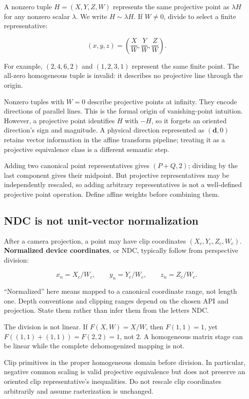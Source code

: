 A nonzero tuple \(H=(X,Y,Z,W)\) represents the same projective point as \(\lambda H\) for any nonzero scalar \(\lambda\). We write \(H\sim\lambda H\). If \(W\ne0\), divide to select a finite representative:

\[
(x,y,z)=\left(\frac XW,\frac YW,\frac ZW\right).
\]

For example, \((2,4,6,2)\) and \((1,2,3,1)\) represent the same finite point. The all-zero homogeneous tuple is invalid: it describes no projective line through the origin.

Nonzero tuples with \(W=0\) describe projective points at infinity. They encode directions of parallel lines. This is the formal origin of vanishing-point intuition. However, a projective point identifies \(H\) with \(-H\), so it forgets an oriented direction's sign and magnitude. A physical direction represented as \((\mathbf d,0)\) retains vector information in the affine transform pipeline; treating it as a projective equivalence class is a different semantic step.

Adding two canonical point representatives gives \((P+Q,2)\); dividing by the last component gives their midpoint. But projective representatives may be independently rescaled, so adding arbitrary representatives is not a well-defined projective point operation. Define affine weights before combining them.

\subsection{NDC is not unit-vector normalization}\label{01-foundations-i-ch018-ndc-is-not-unit-vector-normalization}

After a camera projection, a point may have clip coordinates \((X_c,Y_c,Z_c,W_c)\). \textbf{Normalized device coordinates}, or NDC, typically follow from perspective division:

\[
x_n=X_c/W_c,\qquad y_n=Y_c/W_c,\qquad z_n=Z_c/W_c.
\]

``Normalized'' here means mapped to a canonical coordinate range, not length one. Depth conventions and clipping ranges depend on the chosen API and projection. State them rather than infer them from the letters NDC.

The division is not linear. If \(F(X,W)=X/W\), then \(F(1,1)=1\), yet \(F((1,1)+(1,1))=F(2,2)=1\), not \(2\). A homogeneous matrix stage can be linear while the complete dehomogenized mapping is not.

Clip primitives in the proper homogeneous domain before division. In particular, negative common scaling is valid projective equivalence but does not preserve an oriented clip representative's inequalities. Do not rescale clip coordinates arbitrarily and assume rasterization is unchanged.

